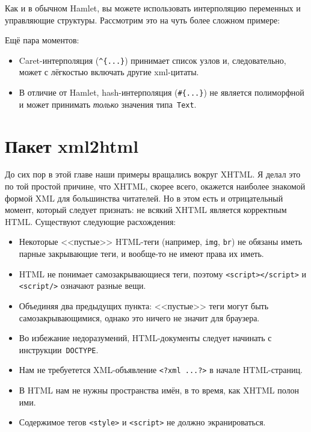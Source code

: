 Как и в обычном Hamlet, вы можете использовать интерполяцию переменных и
управляющие структуры. Рассмотрим это на чуть более сложном примере:


Ещё пара моментов:
\begin{itemize}
    \item Caret-интерполяция (\lstinline!^{...}!) принимает список узлов и,
        следовательно, может с лёгкостью включать другие xml-цитаты.

    \item В отличие от Hamlet, hash-интерполяция (\lstinline!#{...}!) не является
        полиморфной и может принимать \emph{только} значения
        типа~\lstinline!Text!.
\end{itemize}

\section{Пакет xml2html}
До сих пор в этой главе наши примеры вращались вокруг XHTML. Я делал это по той
простой причине, что XHTML, скорее всего, окажется наиболее знакомой формой XML
для большинства читателей. Но в этом есть и отрицательный момент, который
следует признать: не всякий XHTML является корректным HTML. Существуют
следующие расхождения:
\begin{itemize}
    \item Некоторые <<пустые>> HTML-теги (например, \lstinline!img!,
        \lstinline!br!) не обязаны иметь парные закрывающие теги, и вообще-то
        не имеют права их иметь.

    \item HTML не понимает самозакрывающиеся теги, поэтому
        \lstinline!<script></script>! и \lstinline!<script/>! означают разные
        вещи.

    \item Объединяя два предыдущих пункта: <<пустые>> теги могут быть
        самозакрывающимися, однако это ничего не значит для браузера.

    \item Во избежание недоразумений, HTML-документы следует начинать с
        инструкции~\lstinline!DOCTYPE!.

    \item Нам не требуетется XML-объявление \lstinline!<?xml ...?>! в начале
        HTML-страниц.

    \item В HTML нам не нужны пространства имён, в то время, как XHTML полон
        ими.

    \item Содержимое тегов \lstinline!<style>! и \lstinline!<script>! не должно
        экранироваться. %
\end{itemize}

